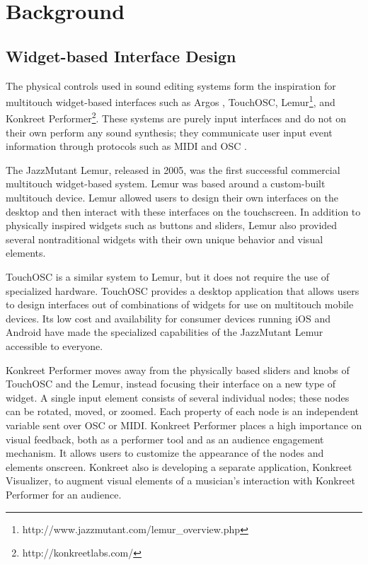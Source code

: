 \documentclass{nime-alternate}
\begin{document}
\section{Background}
\subsection{Widget-based Interface Design}
The physical controls used in sound editing systems form the inspiration for multitouch
widget-based interfaces such as Argos \cite{diakopoulos2010argos}, TouchOSC, 
Lemur\footnote{http://www.jazzmutant.com/lemur\_overview.php}, and Konkreet Performer\footnote{http://konkreetlabs.com/}. These systems are purely
input interfaces and do not on their own perform any sound synthesis; they communicate user input event information through
protocols such as MIDI and OSC \cite{osc}.

The JazzMutant Lemur, released in 2005, was the
first successful commercial multitouch widget-based system. Lemur was based around
a custom-built multitouch device. Lemur allowed users to design their own interfaces
on the desktop and then interact with these interfaces on the touchscreen. In
addition to physically inspired widgets such as buttons and sliders, Lemur also provided
several nontraditional widgets with their own unique behavior and visual elements. 

TouchOSC is a similar system to Lemur, but it does not require the use of specialized hardware.
TouchOSC provides a desktop
application that allows users to design interfaces out of combinations of widgets for use on
multitouch mobile devices. Its low cost and availability for consumer devices running iOS and Android have
made the specialized capabilities of the JazzMutant Lemur accessible to everyone.

Konkreet Performer moves away from the physically based sliders and knobs of TouchOSC and the
Lemur, instead focusing their interface on a new type of widget. A single input element consists of several
individual nodes; these nodes can be rotated, moved, or zoomed. Each property of each node is an independent variable sent over OSC or MIDI. Konkreet Performer places a high importance on visual feedback, both
as a performer tool and as an audience engagement mechanism. It allows users to 
customize the appearance of the nodes and elements onscreen. Konkreet also is developing a 
separate application, Konkreet Visualizer, to augment visual elements of a musician's interaction with Konkreet Performer for an audience.
\end{document}

